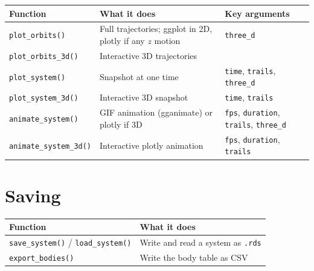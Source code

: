 \documentclass[
  10.5pt,
  letterpaper,
]{scrbook}
\newcounter{none} %
\theoremstyle{plain}
\theoremstyle{remark}
\begin{document}
{\def\LTcaptype{none} %
\begin{longtable}[]{@{}
  >{\raggedright\arraybackslash}p{}
  >{\raggedright\arraybackslash}p{}
  >{\raggedright\arraybackslash}p{}@{}}
\toprule\noalign{}
\begin{minipage}[b]{\linewidth}\raggedright
Function
\end{minipage} & \begin{minipage}[b]{\linewidth}\raggedright
What it does
\end{minipage} & \begin{minipage}[b]{\linewidth}\raggedright
Key arguments
\end{minipage} \\
\midrule\noalign{}
\endhead
\bottomrule\noalign{}
\endlastfoot
\texttt{plot\_orbits()} & Full trajectories; ggplot in 2D, plotly if any
\(z\) motion & \texttt{three\_d} \\
\texttt{plot\_orbits\_3d()} & Interactive 3D trajectories & \\
\texttt{plot\_system()} & Snapshot at one time & \texttt{time},
\texttt{trails}, \texttt{three\_d} \\
\texttt{plot\_system\_3d()} & Interactive 3D snapshot & \texttt{time},
\texttt{trails} \\
\texttt{animate\_system()} & GIF animation (gganimate) or plotly if 3D &
\texttt{fps}, \texttt{duration}, \texttt{trails}, \texttt{three\_d} \\
\texttt{animate\_system\_3d()} & Interactive plotly animation &
\texttt{fps}, \texttt{duration}, \texttt{trails} \\
\end{longtable}
}

\section{Saving}\label{saving}

{\def\LTcaptype{none} %
\begin{longtable}[]{@{}
  >{\raggedright\arraybackslash}p{}
  >{\raggedright\arraybackslash}p{}@{}}
\toprule\noalign{}
\begin{minipage}[b]{\linewidth}\raggedright
Function
\end{minipage} & \begin{minipage}[b]{\linewidth}\raggedright
What it does
\end{minipage} \\
\midrule\noalign{}
\endhead
\bottomrule\noalign{}
\endlastfoot
\texttt{save\_system()} / \texttt{load\_system()} & Write and read a
system as \texttt{.rds} \\
\texttt{export\_bodies()} & Write the body table as CSV \\
\end{longtable}
}
\end{document}
